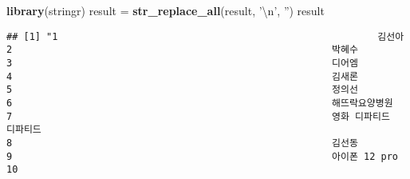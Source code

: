 \documentclass[
]{article}
\newenvironment{Shaded}{\begin{snugshade}}{\end{snugshade}}
\newcommand{\CharTok}[1]{\textcolor[rgb]{0.31,0.60,0.02}{#1}}
\newcommand{\KeywordTok}[1]{\textcolor[rgb]{0.13,0.29,0.53}{\textbf{#1}}}
\newcommand{\NormalTok}[1]{#1}
\newcommand{\StringTok}[1]{\textcolor[rgb]{0.31,0.60,0.02}{#1}}
\begin{document}
\begin{verbatim}
\end{verbatim}

\begin{Shaded}
\begin{Highlighting}[]
\KeywordTok{library}\NormalTok{(stringr)}
\NormalTok{result =}\StringTok{ }\KeywordTok{str_replace_all}\NormalTok{(result, }\StringTok{'}\CharTok{\textbackslash{}n}\StringTok{'}\NormalTok{, }\StringTok{''}\NormalTok{)}
\NormalTok{result}
\end{Highlighting}
\end{Shaded}

\begin{verbatim}
## [1] "1                                                        김선아                                                                                                                                                                                                                        2                                                        박혜수                                                                                                                                                                                                                        3                                                        디어엠                                                                                                                                                                                                                        4                                                        김새론                                                                                                                                                                                                                        5                                                        정의선                                                                                                                                                                                                                        6                                                        해뜨락요양병원                                                                                                                                                                                                                        7                                                        영화 디파티드                                                                    디파티드                                                                                                                                                                                                                                                        8                                                        김선동                                                                                                                                                                                                                        9                                                        아이폰 12 pro                                                                                                                                                                                                                        10 
\end{verbatim}
\end{document}
